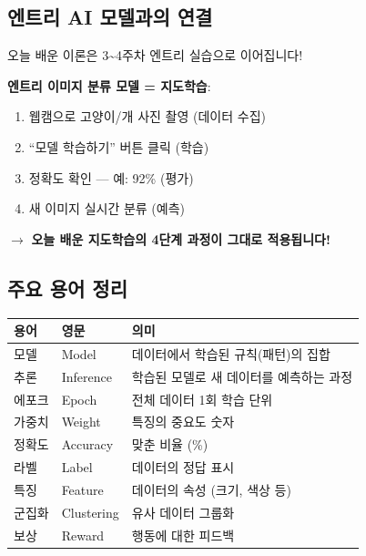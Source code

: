 \documentclass[11pt,a4paper]{article}
\begin{document}
\subsection{엔트리 AI 모델과의 연결}

오늘 배운 이론은 3\textasciitilde 4주차 엔트리 실습으로 이어집니다!

\textbf{엔트리 이미지 분류 모델 = 지도학습}:
\begin{enumerate}[leftmargin=*]
    \item 웹캠으로 고양이/개 사진 촬영 (데이터 수집)
    \item ``모델 학습하기'' 버튼 클릭 (학습)
    \item 정확도 확인 — 예: 92\% (평가)
    \item 새 이미지 실시간 분류 (예측)
\end{enumerate}

$\to$ \textbf{오늘 배운 지도학습의 4단계 과정이 그대로 적용됩니다!}

\subsection{주요 용어 정리}

\begin{center}
\begin{tabular}{|l|l|p{7cm}|}
\hline
\rowcolor{tableheader}
\textbf{용어} & \textbf{영문} & \textbf{의미} \\
\hline
모델 & Model & 데이터에서 학습된 규칙(패턴)의 집합 \\
\hline
추론 & Inference & 학습된 모델로 새 데이터를 예측하는 과정 \\
\hline
에포크 & Epoch & 전체 데이터 1회 학습 단위 \\
\hline
가중치 & Weight & 특징의 중요도 숫자 \\
\hline
정확도 & Accuracy & 맞춘 비율 (\%) \\
\hline
라벨 & Label & 데이터의 정답 표시 \\
\hline
특징 & Feature & 데이터의 속성 (크기, 색상 등) \\
\hline
군집화 & Clustering & 유사 데이터 그룹화 \\
\hline
보상 & Reward & 행동에 대한 피드백 \\
\hline
\end{tabular}
\end{center}

\newpage

\end{document}
